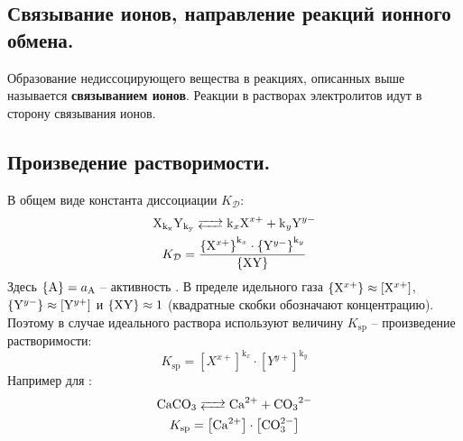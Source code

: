\subsection{Связывание ионов, направление реакций ионного обмена.}
Образование недиссоцирующего вещества в реакциях, описанных выше называется \textbf{связыванием ионов}. Реакции в растворах электролитов идут в сторону связывания ионов. 
\subsection{Произведение растворимости.}
В общем виде константа диссоциации $K_{\mathcal{D}}$:
\begin{gather*}
    \ce{X_{k_{x}}Y_{k_{y}} <--> k_{x}X^{x+} + k_{y}Y^{y-}}\\
    K_{\mathcal{D}} = \frac{\left\lbrace\ce{X}^{x+}\right\rbrace^{\mathrm{k}_{x}}\cdot \left\lbrace\ce{Y}^{y-}\right\rbrace^{\mathrm{k}_{y}}}{\left\lbrace\ce{XY}\right\rbrace}
\end{gather*}
Здесь $\lbrace \ce{A} \rbrace = a_{\ce{A}}$ -- активность . В пределе идельного газа $\left\lbrace\ce{X}^{x+}\right\rbrace\approx \left[\ce{X}^{x+}\right]$, $\left\lbrace\ce{Y}^{y-}\right\rbrace\approx \left[\ce{Y}^{y+}\right]$ и  $\left\lbrace\ce{XY}\right\rbrace \approx 1$ (квадратные скобки обозначают концентрацию). Поэтому в случае идеального раствора используют величину $K_{\mathrm{sp}}$ -- произведение растворимости:
\begin{equation}
K_{\mathrm{sp}} = \left[X^{x+}\right]^{\mathrm{k}_{x}}\cdot \left[Y^{y+}\right]^{\mathrm{k}_{y}}
\end{equation}
Например для :
\begin{gather*}
    \ce{CaCO3 <--> Ca^{2+} + CO3^{2-}}\\
    K_{\mathrm{sp}} = \left[\ce{Ca}^{2+}\right]\cdot\left[\ce{CO3}^{2-}\right]
\end{gather*}